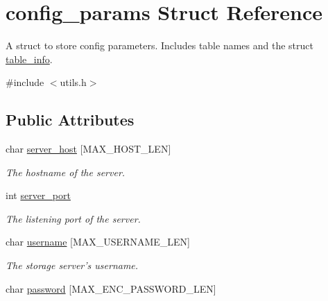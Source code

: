 \hypertarget{structconfig__params}{
\section{config\_\-params Struct Reference}
\label{structconfig__params}
}


A struct to store config parameters. Includes table names and the struct \hyperlink{structtable__info}{table\_\-info}.  




{\ttfamily \#include $<$utils.h$>$}

\subsection*{Public Attributes}
\begin{DoxyCompactItemize}
\item 
\hypertarget{structconfig__params_a962b7bcdbee26333fa776115ed066fb3}{
char \hyperlink{structconfig__params_a962b7bcdbee26333fa776115ed066fb3}{server\_\-host} \mbox{[}MAX\_\-HOST\_\-LEN\mbox{]}}
\label{structconfig__params_a962b7bcdbee26333fa776115ed066fb3}

\begin{DoxyCompactList}\small\item\em The hostname of the server. \item\end{DoxyCompactList}\item 
\hypertarget{structconfig__params_aa7103926e2d35a5d3461a5081723bdcd}{
int \hyperlink{structconfig__params_aa7103926e2d35a5d3461a5081723bdcd}{server\_\-port}}
\label{structconfig__params_aa7103926e2d35a5d3461a5081723bdcd}

\begin{DoxyCompactList}\small\item\em The listening port of the server. \item\end{DoxyCompactList}\item 
\hypertarget{structconfig__params_a4793ceaa4b04decbe50ff4fa9fdde145}{
char \hyperlink{structconfig__params_a4793ceaa4b04decbe50ff4fa9fdde145}{username} \mbox{[}MAX\_\-USERNAME\_\-LEN\mbox{]}}
\label{structconfig__params_a4793ceaa4b04decbe50ff4fa9fdde145}

\begin{DoxyCompactList}\small\item\em The storage server's username. \item\end{DoxyCompactList}\item 
\hypertarget{structconfig__params_a287adb79846d3b33b2e2bdd0cd12f901}{
char \hyperlink{structconfig__params_a287adb79846d3b33b2e2bdd0cd12f901}{password} \mbox{[}MAX\_\-ENC\_\-PASSWORD\_\-LEN\mbox{]}}
\label{structconfig__params_a287adb79846d3b33b2e2bdd0cd12f901}


\end{DoxyCompactItemize}
